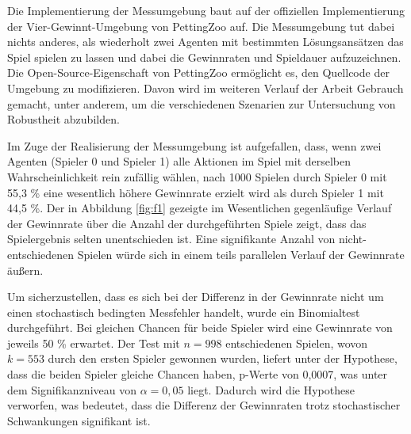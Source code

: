 
Die Implementierung der Messumgebung baut auf der offiziellen Implementierung der Vier-Gewinnt-Umgebung von PettingZoo auf. Die Messumgebung tut dabei nichts anderes, als wiederholt zwei Agenten mit bestimmten Lösungsansätzen das Spiel spielen zu lassen und dabei die Gewinnraten und Spieldauer aufzuzeichnen. Die Open-Source-Eigenschaft von PettingZoo ermöglicht es, den Quellcode der Umgebung zu modifizieren. Davon wird im weiteren Verlauf der Arbeit Gebrauch gemacht, unter anderem, um die verschiedenen Szenarien zur Untersuchung von Robustheit abzubilden.

Im Zuge der Realisierung der Messumgebung ist aufgefallen, dass, wenn zwei Agenten (Spieler 0 und Spieler 1) alle Aktionen im Spiel mit derselben Wahrscheinlichkeit rein zufällig wählen, nach 1000 Spielen durch Spieler 0 mit 55,3 \% eine wesentlich höhere Gewinnrate erzielt wird als durch Spieler 1 mit 44,5 \%. Der in Abbildung \ref{fig:f1} gezeigte im Wesentlichen gegenläufige Verlauf der Gewinnrate über die Anzahl der durchgeführten Spiele zeigt, dass das Spielergebnis selten unentschieden ist. Eine signifikante Anzahl von nicht-entschiedenen Spielen würde sich in einem teils parallelen Verlauf der Gewinnrate äußern.

Um sicherzustellen, dass es sich bei der Differenz in der Gewinnrate nicht um einen stochastisch bedingten Messfehler handelt, wurde ein Binomialtest durchgeführt. Bei gleichen Chancen für beide Spieler wird eine Gewinnrate von jeweils 50 \% erwartet. Der Test mit $n = 998$ entschiedenen Spielen, wovon $k = 553$ durch den ersten Spieler gewonnen wurden, liefert unter der Hypothese, dass die beiden Spieler gleiche Chancen haben, p-Werte von 0,0007, was unter dem Signifikanzniveau von $\alpha = 0,05$ liegt. Dadurch wird die Hypothese verworfen, was bedeutet, dass die Differenz der Gewinnraten trotz stochastischer Schwankungen signifikant ist.

